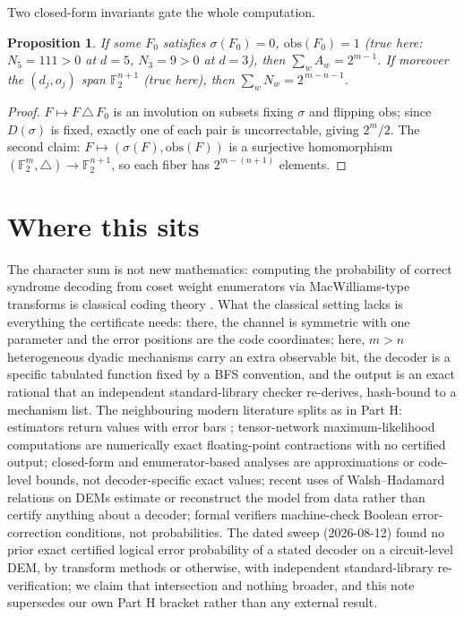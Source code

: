 \documentclass[11pt]{amsart}
\newcommand{\sig}{\sigma}
\newcommand{\obs}{\mathrm{obs}}
\newcommand{\Zt}{\mathbb{F}_2}
\theoremstyle{plain}
\newtheorem{proposition}[theorem]{Proposition}
\theoremstyle{definition}
\theoremstyle{remark}
\begin{document}
Two closed-form invariants gate the whole computation.

\begin{proposition}\label{prop:invariants}
If some $F_0$ satisfies $\sig(F_0) = 0$, $\obs(F_0) = 1$ (true here: $N_5 =
111 > 0$ at $d = 5$, $N_3 = 9 > 0$ at $d=3$), then $\sum_{w} A_w = 2^{m-1}$.
If moreover the $(d_j, o_j)$ span $\Zt^{n+1}$ (true here), then $\sum_w N_w
= 2^{\,m-n-1}$.
\end{proposition}

\begin{proof}
$F \mapsto F \,\triangle\, F_0$ is an involution on subsets fixing
$\sig$ and flipping $\obs$; since $D(\sig)$ is fixed, exactly one of each
pair is uncorrectable, giving $2^m/2$. The second claim: $F \mapsto
(\sig(F), \obs(F))$ is a surjective homomorphism $(\Zt^m, \triangle) \to
\Zt^{n+1}$, so each fiber has $2^{m-(n+1)}$ elements.
\end{proof}

\section{Where this sits}\label{sec:placement}

The character sum is not new mathematics: computing the probability of
correct syndrome decoding from coset weight enumerators via MacWilliams-type
transforms is classical coding theory \cite{JP}. What the classical setting
lacks is everything the certificate needs: there, the channel is symmetric
with one parameter and the error positions are the code coordinates; here,
$m > n$ heterogeneous dyadic mechanisms carry an extra observable bit, the
decoder is a specific tabulated function fixed by a BFS convention, and the
output is an exact rational that an independent standard-library checker
re-derives, hash-bound to a mechanism list. The neighbouring modern
literature splits as in Part H: estimators return values with error bars
\cite{MWB, BV}; tensor-network maximum-likelihood computations
\cite{BSV, DP} are numerically exact floating-point contractions with no
certified output; closed-form and enumerator-based analyses \cite{Regev,
FVC} are approximations or code-level bounds, not decoder-specific exact
values; recent uses of Walsh--Hadamard relations on DEMs
\cite{Willow, CAHR} estimate or reconstruct the model from data rather than
certify anything about a decoder; formal verifiers \cite{LeanQEC, VeriQEC}
machine-check Boolean error-correction conditions, not probabilities. The
dated sweep (2026-08-12) found no prior exact certified logical error
probability of a stated decoder on a circuit-level DEM, by transform methods
or otherwise, with independent standard-library re-verification; we claim
that intersection and nothing broader, and this note supersedes our own
Part H bracket \cite{PartH} rather than any external result.
\end{document}
